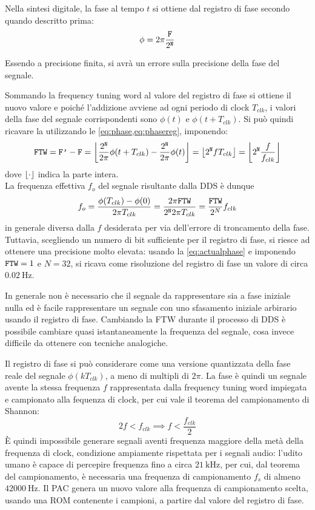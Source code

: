 Nella sintesi digitale, la fase al tempo $t$ si ottiene dal registro di fase secondo quando descritto prima:
\begin{equation}
\label{eq:phasereg}
\phi = 2\pi\frac{\code{F}}{2^\code{N}}
\end{equation}

Essendo  a precisione finita, si avrà un errore sulla precisione della fase del segnale.

Sommando la frequency tuning word al valore del registro di fase  si ottiene il nuovo valore 
e poiché l'addizione avviene ad ogni periodo di clock $T_{clk}$, i valori della fase del segnale corrispondenti sono
$\phi(t)$ e $\phi(t + T_{clk})$.
Si può quindi ricavare la  utilizzando le
\cref{eq:phase,eq:phasereg}, imponendo:
\[
\code{FTW} = \code{F'} - \code{F} = 
\floor*{\frac{2^\code{N}}{2\pi}\phi(t+T_{clk}) - \frac{2^\code{N}}{2\pi}\phi(t)}
= \floor*{2^\code{N} f T_{clk}} = \floor*{2^\code{N} \frac{f}{f_{clk}}}
\]
dove $\floor*{\cdot}$ indica la parte intera. \\
La frequenza effettiva $f_{o}$ del segnale risultante dalla DDS è dunque
\begin{equation}
\label{eq:actualphase}
f_{o} = \frac{\phi(T_{clk}) - \phi(0)}{2\pi T_{clk}} = \frac{2\pi \code{FTW}}{2^\code{N} 2 \pi T_{clk}} = \frac{\code{FTW}}{2^N} f_{clk}
\end{equation}
in generale diversa dalla $f$ desiderata per via dell'errore di troncamento della fase.
Tuttavia, scegliendo un numero di bit sufficiente per il registro di fase, si riesce
ad ottenere una precisione molto elevata: usando la \cref{eq:actualphase}
e imponendo $\code{FTW}=1$ e $N=32$, si ricava come risoluzione del registro di fase 
un valore di circa $\SI{0.02}{\hertz}$.

In generale non è necessario che il segnale da rappresentare sia a fase
iniziale nulla ed è facile rappresentare un segnale con uno sfasamento
iniziale arbirario usando il registro di fase.
Cambiando la FTW durante il processo di DDS è possibile cambiare
quasi istantaneamente la frequenza del segnale, cosa invece difficile
da ottenere con tecniche analogiche.

Il registro di fase si può considerare come una versione quantizzata della
fase reale del segnale $\phi(k T_{clk})$, a meno di multipli di $2\pi$.
La fase è quindi un segnale avente la stessa frequenza $f$ rappresentata dalla frequency
tuning word impiegata e campionato alla fequenza di clock, per cui vale il teorema
del campionamento di Shannon:
\[
   2f < f_{clk} \implies f < \frac{f_{clk}}{2}
\]
È quindi impossibile generare segnali aventi frequenza maggiore della metà della
frequenza di clock, condizione ampiamente rispettata per i segnali audio:
l'udito umano è capace di percepire frequenza fino a circa $\SI{21}{\kilo\hertz}$, 
per cui, dal teorema del campionamento, è necessaria una frequenza di campionamento $f_s$ di almeno $\SI{42000}{\hertz}$.
Il PAC genera un nuovo valore alla frequenza di campionamento scelta, usando
una ROM contenente i campioni, a partire dal valore del registro di fase.

